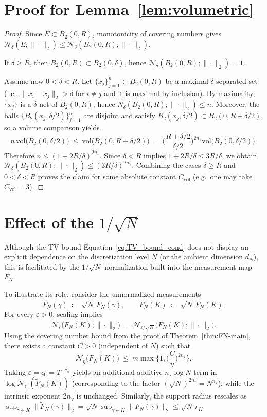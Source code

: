 \documentclass{article}
\def\Eqref#1{Equation~\ref{#1}}
\begin{document}
\section{Proof for Lemma~\ref{lem:volumetric}}
\begin{proof}
Since $E\subset B_2(0,R)$, monotonicity of covering numbers gives
$\mathcal{N}_\delta(E;\|\cdot\|_2)\le \mathcal{N}_\delta(B_2(0,R);\|\cdot\|_2)$.

If $\delta\ge R$, then $B_2(0,R)\subset B_2(0,\delta)$, hence
$\mathcal{N}_\delta(B_2(0,R);\|\cdot\|_2)=1$.

Assume now $0<\delta<R$. Let $\{x_j\}_{j=1}^n\subset B_2(0,R)$ be a maximal $\delta$-separated set
(i.e., $\|x_i-x_j\|_2>\delta$ for $i\neq j$ and it is maximal by inclusion).
By maximality, $\{x_j\}$ is a $\delta$-net of $B_2(0,R)$, hence
$N_\delta(B_2(0,R);\|\cdot\|_2)\le n$.
Moreover, the balls $\{B_2(x_j,\delta/2)\}_{j=1}^n$ are disjoint and satisfy
$B_2(x_j,\delta/2)\subset B_2(0,R+\delta/2)$, so a volume comparison yields
\[
n\,\mathrm{vol}\big(B_2(0,\delta/2)\big)
\ \le\ \mathrm{vol}\big(B_2(0,R+\delta/2)\big)
\ =\ \Big(\frac{R+\delta/2}{\delta/2}\Big)^{2n_{\mathrm v}}\mathrm{vol}\big(B_2(0,\delta/2)\big).
\]
Therefore $n\le (1+2R/\delta)^{2n_{\mathrm v}}$. Since $\delta<R$ implies $1+2R/\delta\le 3R/\delta$, we obtain
$\mathcal{N}_\delta(B_2(0,R);\|\cdot\|_2)\le (3R/\delta)^{2n_{\mathrm v}}$.
Combining the cases $\delta\ge R$ and $0<\delta<R$ proves the claim for some absolute constant
$C_{\mathrm{vol}}$ (e.g.\ one may take $C_{\mathrm{vol}}=3$).
\end{proof}

\section{Effect of the $1/\sqrt{N}$}
\label{sec:normalization}
Although the TV bound \Eqref{eq:TV_bound_cond} does not display an explicit dependence on the discretization
level $N$ (or the ambient dimension $d_N$), this is facilitated by the $1/\sqrt{N}$ normalization built into
the measurement map $F_N$.

To illustrate its role, consider the unnormalized measurements
\[
\widetilde F_N(\gamma)\ \coloneqq \ \sqrt{N}\,F_N(\gamma),\qquad \widetilde F_N(K)\ \coloneqq \ \sqrt{N}\,F_N(K).
\]
For every $\varepsilon>0$, scaling implies
\[
\mathcal{N}_\varepsilon\!\big(\widetilde F_N(K);\|\cdot\|_2\big)\ =\ \mathcal{N}_{\varepsilon/\sqrt{N}}\!\big(F_N(K);\|\cdot\|_2\big).
\]
Using the covering number bound from the proof of Theorem~\ref{thm:FN-main}, there exists a constant
$C>0$ (independent of $N$) such that
\[
\mathcal{N}_\eta\big(F_N(K)\big)\ \le\ m\max\Big\{1,\Big(\frac{C}{\eta}\Big)^{2n_{\mathrm v}}\Big\}.
\]
Taking $\varepsilon=\epsilon_0=T^{-c_{\epsilon_0}}$ yields an additional additive $n_{\mathrm v}\log N$ term in
$\log \mathcal{N}_{\epsilon_0}(\widetilde F_N(K))$ (corresponding to the factor $(\sqrt{N})^{2n_{\mathrm v}}=N^{n_{\mathrm v}}$),
while the intrinsic exponent $2n_{\mathrm v}$ is unchanged.
Similarly, the support radius rescales as
$\sup_{\gamma\in K}\|\widetilde F_N(\gamma)\|_2=\sqrt{N}\sup_{\gamma\in K}\|F_N(\gamma)\|_2\le \sqrt{N}\,r_K$.
\end{document}
